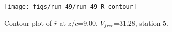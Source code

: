 \begin{figure}[H]
\centering
\texttt{[image: figs/run\_49/run\_49\_R\_contour]}
\caption{Contour plot of $\overline{r}$ at $z/c$=9.00, $V_{free}$=31.28, station 5.}
\end{figure}


